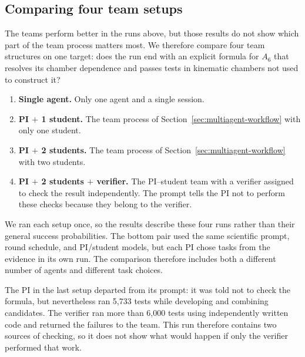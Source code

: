 \documentclass{article}
\begin{document}
\subsection{Comparing four team setups}
\label{sec:architecture-comparison}

The teams perform better in the runs above, but those results do not show which
part of the team process matters most. We therefore compare four
team structures on one target: does the run end with an explicit formula for
$A_6$ that resolves its chamber dependence and passes tests in kinematic
chambers not used to construct it?

\begin{enumerate}
    \item \textbf{Single agent.} Only one agent and a single session.

    \item \textbf{PI $+$ 1 student.} The team process of
    Section~\ref{sec:multiagent-workflow} with only one student.

    \item \textbf{PI $+$ 2 students.} The team process of
    Section~\ref{sec:multiagent-workflow} with two students.

    \item \textbf{PI $+$ 2 students $+$ verifier.} The
    PI--student team with a verifier assigned to check the result
    independently. The prompt tells the PI not to perform these checks
    because they belong to the verifier.
\end{enumerate}

We ran each setup once, so the results describe these four runs rather than
their general success probabilities. The bottom pair used the same scientific
prompt, round schedule, and PI/student models, but each PI chose tasks from the
evidence in its own run. The comparison therefore includes both a different
number of agents and different task choices.

The PI in the last setup departed from its prompt: it was told not to check
the formula, but nevertheless ran 5,733 tests while developing and combining
candidates. The verifier ran more than 6,000 tests using
independently written code and returned the failures to the team. This run
therefore contains two sources of checking, so it does not show what would
happen if only the verifier performed that work.
\end{document}
